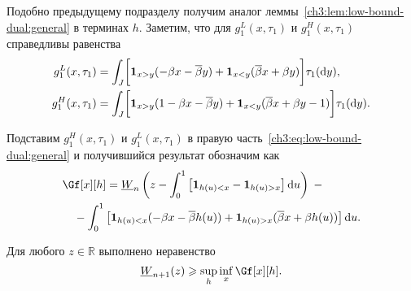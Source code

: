 {Подобно предыдущему подразделу получим аналог леммы~\ref{ch3:lem:low-bound-dual:general} в терминах $h$.
Заметим, что для $g_1^L(x, \tau_1)$ и $g_1^H(x, \tau_1)$ справедливы равенства
\begin{align*}
  g_1^L(x,\tau_1) &=
                      \int_J \biggl[
                      \mathbf{1}_{x>y} (-\beta x - {{\overline{\beta}}} y) +
                      \mathbf{1}_{x<y} ({{\overline{\beta}}} x + \beta y)
                      \biggr] \tau_1(\mathop{}\!\mathrm{d} y),\\
  g_1^H(x,\tau_1) &=
                      \int_J \biggl[
                      \mathbf{1}_{x>y} (1 -\beta x - {{\overline{\beta}}} y) +
                      \mathbf{1}_{x<y} ({{\overline{\beta}}} x + \beta y - 1)
                      \biggr] \tau_1(\mathop{}\!\mathrm{d} y).
\end{align*}

Подставим $g_1^H(x, \tau_1)$ и $g_1^L(x,\tau_1)$ в правую часть~\eqref{ch3:eq:low-bound-dual:general} и получившийся результат обозначим как
\begin{equation}\label{eq:W-low-bound:parameterized}
\begin{multlined}
  \Gf[x][h] =
  \LW{n}\left( 
    z - \int_0^1 \left[ \Ind{h(u) < x} - \Ind{h(u) > x} \right] \di u
  \right) \; - \\
  - \int_0^1 \left[ 
    \Ind{h(u) < x} (-\Co x - \DCo h(u)) + 
    \Ind{h(u) > x} (\DCo x + \Co h(u)) 
  \right] \di u.
\end{multlined}
\end{equation}

\begin{lemma}\label{ch3:lem:W-low-bound:parameterized}
  Для любого $z \in \mathbb{R}$ выполнено неравенство
  \begin{equation*}
    \LW{n+1}(z) \geqslant \sup_h \inf_{x} \Gf[x][h].
  \end{equation*}
\end{lemma}

}
